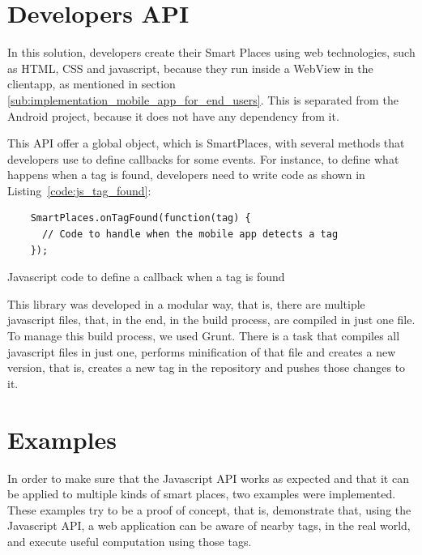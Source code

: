 \section{Developers API}
\label{sec:implementation_developers_api}
In this solution, developers create their Smart Places using web technologies, such as \gls{HTML}, \gls{CSS} and javascript, because they run inside a WebView in the clientapp, as mentioned in section \ref{sub:implementation_mobile_app_for_end_users}.
This is separated from the Android project, because it does not have any dependency from it.

This \gls{API} offer a global object, which is SmartPlaces, with several methods that developers use to define callbacks for some events. For instance, to define what happens when a tag is found, developers need to write code as shown in Listing~\ref{code:js_tag_found}:

\begin{listing}[H]
  \begin{verbatim}
    SmartPlaces.onTagFound(function(tag) {
      // Code to handle when the mobile app detects a tag
    });
  \end{verbatim}
  \caption[Tag found]{Javascript code to define a callback when a tag is found}
  \label{code:js_tag_found}
\end{listing}

This library was developed in a modular way, that is, there are multiple javascript files, that, in the end, in the build process, are compiled in just one file.
To manage this build process, we used Grunt. There is a task that compiles all javascript files in just one, performs minification of that file and creates a new version, that is, creates a new tag in the repository and pushes those changes to it.

\section{Examples}
\label{sec:implementation_examples}
In order to make sure that the Javascript \gls{API} works as expected and that it can be applied to multiple kinds of smart places, two examples were implemented.
These examples try to be a proof of concept, that is, demonstrate that, using the Javascript API, a web application can be aware of nearby tags, in the real world, and execute useful computation using those tags.

